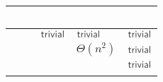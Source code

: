\renewcommand{\arraystretch}{1.2}
\begin{tabular}{|l|l|l|p{4.3em}|l|}
	\hline
	~     & \ODFA           & \ONFA           & \TDFA                                            & \TNFA     \\ \hline
	\ODFA & \cY             & $\Cctriv$       & $\Cctriv$                                        & $\Cctriv$ \\ \hline
	\ONFA & \rbt{$\CsubEq$} & \cY             & \cR $\Theta(n^2)$                                & $\Cctriv$ \\ \hline
	\TDFA & \rbt{$\CsubEq$} & \rbt{$\CsubEq$} & \cY                                              & $\Cctriv$ \\ \hline
	\TNFA & \rbt{$\CsubEq$} & \rbt{$\CsubEq$} & \cR \rbt[.4]{$\le\Csubln$} \rbt[.3]{$\ge\Cpoly$} & \cY       \\ \hline
\end{tabular}
